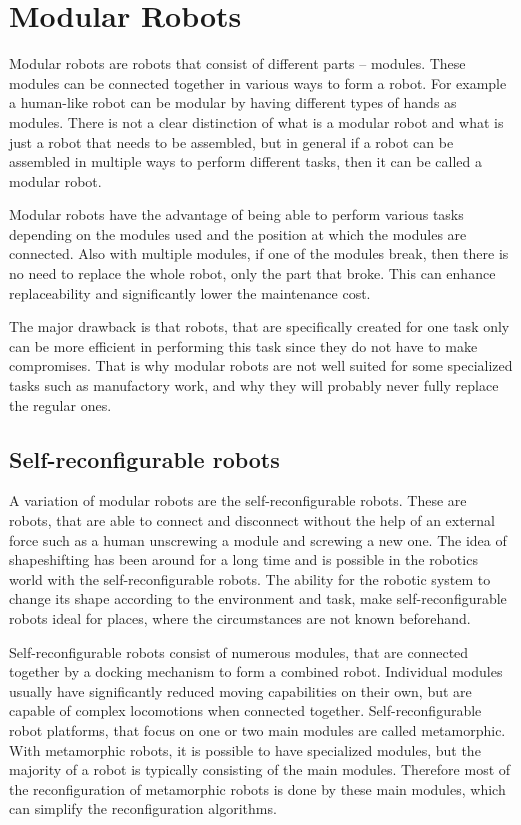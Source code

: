 \documentclass[
  digital, %
  table,   %
  oneside, %
  nolof,     %
  nolot,     %
]{fithesis3}
\begin{document}
\chapter{Modular Robots}



Modular robots are robots that consist of different parts -- modules.
These modules can be connected together in various ways to form a robot.
For example a human-like robot can be modular by having different types of hands as modules.
There is not a clear distinction of what is a modular robot and what is just a robot that needs to be assembled, but in general if a robot can be assembled in multiple ways to perform different tasks, then it can be called a modular robot.

Modular robots have the advantage of being able to perform various tasks depending on the modules used and the position at which the modules are connected.
Also with multiple modules, if one of the modules break, then there is no need to replace the whole robot, only the part that broke.
This can enhance replaceability and significantly lower the maintenance cost.

The major drawback is that robots, that are specifically created for one task only can be more efficient in performing this task since they do not have to make compromises.
That is why modular robots are not well suited for some specialized tasks such as manufactory work, and why they will probably never fully replace the regular ones.

\section{Self-reconfigurable robots}

A variation of modular robots are the self-reconfigurable robots.
These are robots, that are able to connect and disconnect without the help of an external force such as a human unscrewing a module and screwing a new one.
The idea of shapeshifting has been around for a long time and is possible in the robotics world with the self-reconfigurable robots.
The ability for the robotic system to change its shape according to the environment and task, make self-reconfigurable robots ideal for places, where the circumstances are not known beforehand.

Self-reconfigurable robots consist of numerous modules, that are connected together by a docking mechanism to form a combined robot.
Individual modules usually have significantly reduced moving capabilities on their own, but are capable of complex locomotions when connected together.
Self-reconfigurable robot platforms, that focus on one or two main modules are called metamorphic.
With metamorphic robots, it is possible to have specialized modules, but the majority of a robot is typically consisting of the main modules.
Therefore most of the reconfiguration of metamorphic robots is done by these main modules, which can simplify the reconfiguration algorithms.
\end{document}
